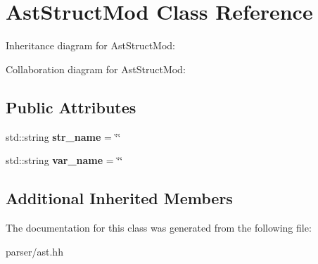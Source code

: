 \hypertarget{classAstStructMod}{}\section{Ast\+Struct\+Mod Class Reference}
\label{classAstStructMod}


Inheritance diagram for Ast\+Struct\+Mod\+:


Collaboration diagram for Ast\+Struct\+Mod\+:
\subsection*{Public Attributes}
\begin{DoxyCompactItemize}
\item 
\mbox{\label{classAstStructMod_af494b97eb9a8a2c0a377300f550b8315}} 
std\+::string {\bfseries str\+\_\+name} = \char`\"{}\char`\"{}
\item 
\mbox{\label{classAstStructMod_ada4fd26bb36a1c1a39438a2039c4fe59}} 
std\+::string {\bfseries var\+\_\+name} = \char`\"{}\char`\"{}
\end{DoxyCompactItemize}
\subsection*{Additional Inherited Members}


The documentation for this class was generated from the following file\+:\begin{DoxyCompactItemize}
\item 
parser/ast.\+hh\end{DoxyCompactItemize}
